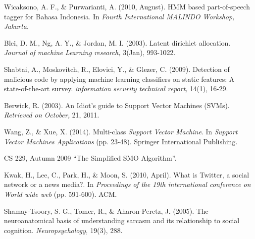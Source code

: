 \begin{thebibliography}{7}
{Wicaksono, A. F., \& Purwarianti, A. (2010, August). HMM based part-of-speech tagger for Bahasa Indonesia. In \emph{Fourth International MALINDO Workshop, Jakarta.}}

{Blei, D. M., Ng, A. Y., \& Jordan, M. I. (2003). Latent dirichlet allocation. \emph{Journal of machine Learning research, }3(Jan), 993-1022.}

{Shabtai, A., Moskovitch, R., Elovici, Y., \& Glezer, C. (2009). Detection of malicious code by applying machine learning classifiers on static features: A state-of-the-art survey. \emph{information security technical report,} 14(1), 16-29. }

{Berwick, R. (2003). An Idiot’s guide to Support Vector Machines (SVMs). \emph{Retrieved on October, }21, 2011.}

{Wang, Z., \& Xue, X. (2014). Multi-class \emph{Support Vector Machine}. In \emph{Support Vector Machines Applications }(pp. 23-48). Springer International Publishing.}

{CS 229, Autumn 2009 “The Simplified SMO Algorithm”.}

{Kwak, H., Lee, C., Park, H., \& Moon, S. (2010, April). What is Twitter, a social network or a news media?. In \emph{Proceedings of the 19th international conference on World wide web }(pp. 591-600). ACM.}

{Shamay-Tsoory, S. G., Tomer, R., \& Aharon-Peretz, J. (2005). The neuroanatomical basis of understanding sarcasm and its relationship to social cognition. \emph{Neuropsychology,} 19(3), 288.}
\end{thebibliography}
